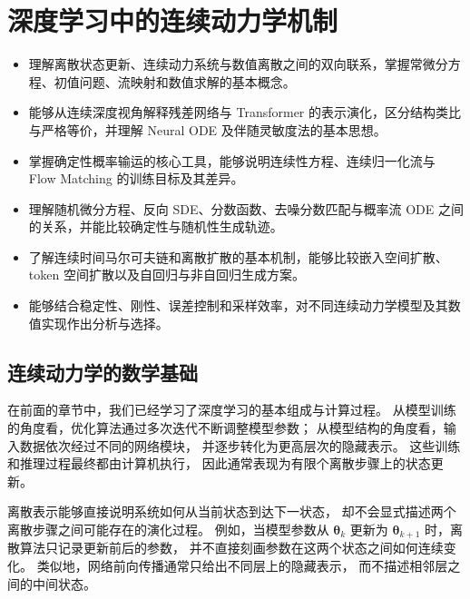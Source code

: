 \chapter{深度学习中的连续动力学机制}

\begin{learninggoals}
  \begin{itemize}
    \item 理解离散状态更新、连续动力系统与数值离散之间的双向联系，掌握常微分方程、初值问题、流映射和数值求解的基本概念。
    \item 能够从连续深度视角解释残差网络与 Transformer 的表示演化，区分结构类比与严格等价，并理解 Neural ODE 及伴随灵敏度法的基本思想。
    \item 掌握确定性概率输运的核心工具，能够说明连续性方程、连续归一化流与 Flow Matching 的训练目标及其差异。
    \item 理解随机微分方程、反向 SDE、分数函数、去噪分数匹配与概率流 ODE 之间的关系，并能比较确定性与随机性生成轨迹。
    \item 了解连续时间马尔可夫链和离散扩散的基本机制，能够比较嵌入空间扩散、 token 空间扩散以及自回归与非自回归生成方案。
    \item 能够结合稳定性、刚性、误差控制和采样效率，对不同连续动力学模型及其数值实现作出分析与选择。
  \end{itemize}
\end{learninggoals}

\section{连续动力学的数学基础}
\label{sec:discrete-to-continuous-dynamics}

在前面的章节中，我们已经学习了深度学习的基本组成与计算过程。
从模型训练的角度看，优化算法通过多次迭代不断调整模型参数；
从模型结构的角度看，输入数据依次经过不同的网络模块，
并逐步转化为更高层次的隐藏表示。
这些训练和推理过程最终都由计算机执行，
因此通常表现为有限个离散步骤上的状态更新。

离散表示能够直接说明系统如何从当前状态到达下一状态，
却不会显式描述两个离散步骤之间可能存在的演化过程。
例如，当模型参数从
\(\boldsymbol{\theta}_k\)
更新为
\(\boldsymbol{\theta}_{k+1}\)
时，离散算法只记录更新前后的参数，
并不直接刻画参数在这两个状态之间如何连续变化。
类似地，网络前向传播通常只给出不同层上的隐藏表示，
而不描述相邻层之间的中间状态。

